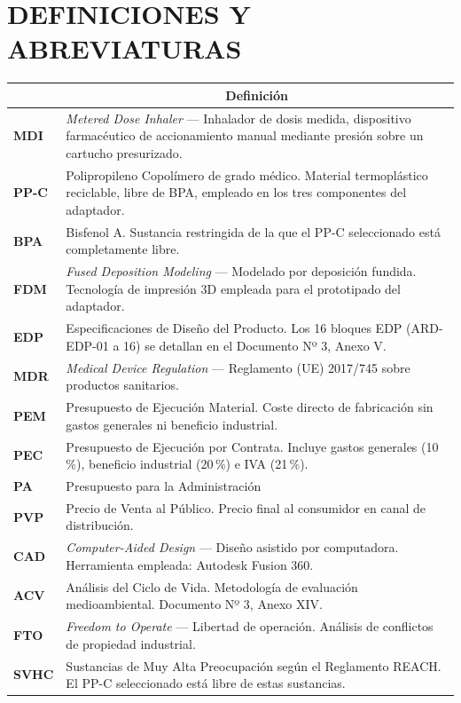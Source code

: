 \documentclass[11pt,a4paper]{article}
\begin{document}
\newpage
\section{DEFINICIONES Y ABREVIATURAS}

\begin{table}[H]
    \centering
    \small
    \renewcommand{\arraystretch}{1.5}
    \begin{tabularx}{\linewidth}{|>{\bfseries\color{ArthroNavy}}m{2.8cm}|X|}
        \hline
        \rowcolor{ArthroNavy}
        \multicolumn{1}{|c|}{\color{white}\textbf{Abreviatura}} & \multicolumn{1}{c|}{\color{white}\textbf{Definición}} \\ \hline
        MDI & \textit{Metered Dose Inhaler} — Inhalador de dosis medida, dispositivo farmacéutico de accionamiento manual mediante presión sobre un cartucho presurizado. \\ \hline
        PP-C & Polipropileno Copolímero de grado médico. Material termoplástico reciclable, libre de BPA, empleado en los tres componentes del adaptador. \\ \hline
         BPA & Bisfenol A. Sustancia restringida de la que el PP-C seleccionado está completamente libre. \\ \hline
        FDM & \textit{Fused Deposition Modeling} — Modelado por deposición fundida. Tecnología de impresión 3D empleada para el prototipado del adaptador. \\ \hline
        EDP & Especificaciones de Diseño del Producto. Los 16 bloques EDP (ARD-EDP-01 a 16) se detallan en el Documento Nº 3, Anexo V. \\ \hline
        MDR & \textit{Medical Device Regulation} — Reglamento (UE) 2017/745 sobre productos sanitarios. \\ \hline
        PEM & Presupuesto de Ejecución Material. Coste directo de fabricación sin gastos generales ni beneficio industrial. \\ \hline
        PEC & Presupuesto de Ejecución por Contrata. Incluye gastos generales (10\,\%), beneficio industrial (20\,\%) e IVA (21\,\%). \\ \hline
        PA & Presupuesto para la Administración  \\ \hline
        PVP & Precio de Venta al Público. Precio final al consumidor en canal de distribución. \\ \hline
        CAD & \textit{Computer-Aided Design} — Diseño asistido por computadora. Herramienta empleada: Autodesk Fusion 360. \\ \hline
        ACV & Análisis del Ciclo de Vida. Metodología de evaluación medioambiental. Documento Nº 3, Anexo XIV. \\ \hline
        FTO & \textit{Freedom to Operate} — Libertad de operación. Análisis de conflictos de propiedad industrial. \\ \hline
        SVHC & Sustancias de Muy Alta Preocupación según el Reglamento REACH. El PP-C seleccionado está libre de estas sustancias. \\ \hline
       

\end{tabularx}
\end{table}
\end{document}
